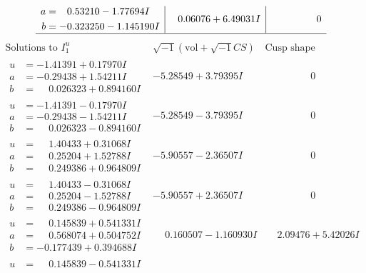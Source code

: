 \documentclass[1p]{elsarticle_modified}
\theoremstyle{definition}
\newcommand{\I}{\sqrt{-1}}
\begin{document}
$$\begin{array}{c|c|c}
\begin{aligned}
a &= \phantom{-}0.53210 - 1.77694 I \\
b &= -0.323250 - 1.145190 I\end{aligned}
 & \phantom{-}0.06076 + 6.49031 I & \phantom{-0.000000 } 0\\
 \hline 
 \end{array}$$\newpage$$\begin{array}{c|c|c}  
\text{Solutions to }I^u_{1}& \I (\text{vol} + \sqrt{-1}CS) & \text{Cusp shape}\\
 \hline 
\begin{aligned}
u &= -1.41391 + 0.17970 I \\
a &= -0.29438 + 1.54211 I \\
b &= \phantom{-}0.026323 + 0.894160 I\end{aligned}
 & -5.28549 + 3.79395 I & \phantom{-0.000000 } 0 \\ \hline\begin{aligned}
u &= -1.41391 - 0.17970 I \\
a &= -0.29438 - 1.54211 I \\
b &= \phantom{-}0.026323 - 0.894160 I\end{aligned}
 & -5.28549 - 3.79395 I & \phantom{-0.000000 } 0 \\ \hline\begin{aligned}
u &= \phantom{-}1.40433 + 0.31068 I \\
a &= \phantom{-}0.25204 + 1.52788 I \\
b &= \phantom{-}0.249386 + 0.964809 I\end{aligned}
 & -5.90557 - 2.36507 I & \phantom{-0.000000 } 0 \\ \hline\begin{aligned}
u &= \phantom{-}1.40433 - 0.31068 I \\
a &= \phantom{-}0.25204 - 1.52788 I \\
b &= \phantom{-}0.249386 - 0.964809 I\end{aligned}
 & -5.90557 + 2.36507 I & \phantom{-0.000000 } 0 \\ \hline\begin{aligned}
u &= \phantom{-}0.145839 + 0.541331 I \\
a &= \phantom{-}0.568074 + 0.504752 I \\
b &= -0.177439 + 0.394688 I\end{aligned}
 & \phantom{-}0.160507 - 1.160930 I & \phantom{-}2.09476 + 5.42026 I \\ \hline\begin{aligned}
u &= \phantom{-}0.145839 - 0.541331 I \\

\end{aligned}
\end{array}$$
\end{document}
